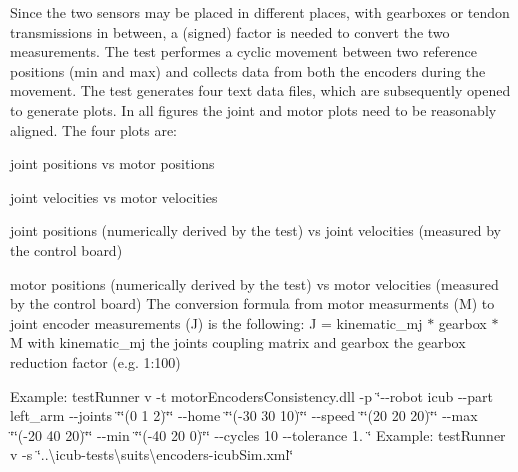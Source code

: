 Since the two sensors may be placed in different places, with gearboxes or tendon transmissions in between, a (signed) factor is needed to convert the two measurements. The test performes a cyclic movement between two reference positions (min and max) and collects data from both the encoders during the movement. The test generates four text data files, which are subsequently opened to generate plots. In all figures the joint and motor plots need to be reasonably aligned. The four plots are\-: \begin{DoxyItemize}
\item joint positions vs motor positions \item joint velocities vs motor velocities \item joint positions (numerically derived by the test) vs joint velocities (measured by the control board) \item motor positions (numerically derived by the test) vs motor velocities (measured by the control board) The conversion formula from motor measurments (M) to joint encoder measurements (J) is the following\-: J = kinematic\-\_\-mj $\ast$ gearbox $\ast$ M with kinematic\-\_\-mj the joints coupling matrix and gearbox the gearbox reduction factor (e.\-g. 1\-:100)\end{DoxyItemize}
Example\-: test\-Runner v -\/t motor\-Encoders\-Consistency.\-dll -\/p \char`\"{}-\/-\/robot icub -\/-\/part left\-\_\-arm -\/-\/joints \char`\"{}\char`\"{}(0 1 2)\char`\"{}\char`\"{} -\/-\/home \char`\"{}\char`\"{}(-\/30 30 10)\char`\"{}\char`\"{} -\/-\/speed \char`\"{}\char`\"{}(20 20 20)\char`\"{}\char`\"{} -\/-\/max \char`\"{}\char`\"{}(-\/20 40 20)\char`\"{}\char`\"{} -\/-\/min \char`\"{}\char`\"{}(-\/40 20 0)\char`\"{}\char`\"{} -\/-\/cycles 10 -\/-\/tolerance 1. \char`\"{} Example\-: test\-Runner v -\/s \char`\"{}..\textbackslash{}icub-\/tests\textbackslash{}suits\textbackslash{}encoders-\/icub\-Sim.\-xml\char`\"{}

